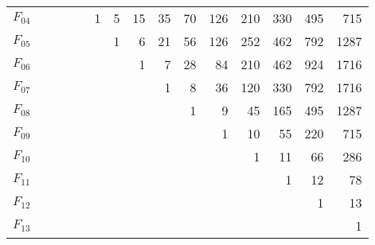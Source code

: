 \documentclass[12pt,a4paper]{article}
\begin{document}
\begin{table}
\begin{center}
\begin{tabular}{|r|r|r|r|r|r|r|r|r|r|r|r|r|r|r|}
$F_{04}$ &   &           &    &                     &  1                  &   5                  &  15 &  35 &  70 & 126                  & 210                 & 330                 & 495 &  715                     \\
$F_{05}$ &   &           &    &                     &                     &   1                  &   6 &  21 &  56 & 126                  & 252                 & 462                 & 792 & 1287                     \\
$F_{06}$ &   &           &    &                     &                     &                      &   1 &   7 &  28 &  84                  & 210                 & 462                 & 924 & 1716                     \\
$F_{07}$ &   &           &    &                     &                     &                      &     &   1 &   8 &  36                  & 120                 & 330                 & 792 & 1716                     \\
$F_{08}$ &   &           &    &                     &                     &                      &     &     &   1 &   9                  &  45                 & 165                 & 495 & 1287                     \\
$F_{09}$ &   &           &    &                     &                     &                      &     &     &     &   1                  &  10                 &  55                 & 220 &  715                     \\
$F_{10}$ &   &           &    &                     &                     &                      &     &     &     &                      &   1                 &  11                 &  66 &  286                     \\
$F_{11}$ &   &           &    &                     &                     &                      &     &     &     &                      &                     &   1                 &  12 &   78                     \\
$F_{12}$ &   &           &    &                     &                     &                      &     &     &     &                      &                     &                     &   1 &   13                     \\
$F_{13}$ &   &           &    &                     &                     &                      &     &     &     &                      &                     &                     &     &    1                     \\
\hline                            
\end{tabular}                     
\end{center}                      
\end{table}                       
%                                 
\end{document}
